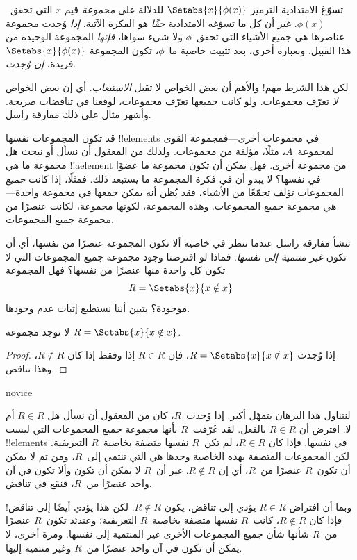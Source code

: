 \documentclass[../../../include/open-logic-section]{subfiles}
\begin{document}

تسوّغ الامتدادية الترميز $\Setabs{x}{\phi(x)}$ للدلالة على
\emph{مجموعة} قيم $x$ التي تحقق~$\phi(x)$. غير أن كل ما تسوّغه
الامتدادية \emph{حقًا} هو الفكرة الآتية. \emph{إذا} وُجدت مجموعة
عناصرها هي جميع الأشياء التي تحقق~$\phi$ ولا شيء سواها، \emph{فإنها}
المجموعة الوحيدة من هذا القبيل. وبعبارة أخرى، بعد تثبيت خاصية ما~$\phi$،
تكون المجموعة $\Setabs{x}{\phi(x)}$ فريدة، \emph{إن وُجدت}.

لكن هذا الشرط مهم!{} والأهم أن بعض الخواص لا تقبل
\emph{الاستيعاب}. أي إن بعض الخواص \emph{لا} تعرّف مجموعات.
ولو كانت جميعها تعرّف مجموعات، لوقعنا في تناقضات صريحة. وأشهر مثال
على ذلك مفارقة راسل.

قد تكون المجموعات نفسها !!{element}s في مجموعات أخرى---فمجموعة القوى
لمجموعة~$A$، مثلًا، مؤلفة من مجموعات. ولذلك من المعقول أن نسأل أو
نبحث هل مجموعة ما هي !!a{element} من مجموعة أخرى. فهل يمكن أن تكون
مجموعة ما عضوًا في نفسها؟ لا يبدو أن في فكرة المجموعة ما يستبعد ذلك.
فمثلًا، إذا كانت \emph{جميع} المجموعات تؤلف تجمّعًا من الأشياء، فقد
يُظن أنه يمكن جمعها في مجموعة واحدة---هي مجموعة جميع المجموعات.
وهذه المجموعة، لكونها مجموعة، لكانت عنصرًا من مجموعة جميع
المجموعات.

تنشأ مفارقة راسل عندما ننظر في خاصية ألا تكون المجموعة عنصرًا
من نفسها، أي أن تكون \emph{غير منتمية إلى نفسها}. فماذا لو
افترضنا وجود مجموعة جميع المجموعات التي لا تكون كل واحدة منها
عنصرًا من نفسها؟ فهل المجموعة
\[
R = \Setabs{x}{x \notin x}
\]
موجودة؟ يتبين أننا نستطيع إثبات عدم وجودها.

\begin{thm}
	لا توجد مجموعة $R = \Setabs{x}{x \notin x}$.
\end{thm}

\begin{proof}
إذا وُجدت $R = \Setabs{x}{x \notin x}$، فإن
$R \in R$ إذا وفقط إذا كان $R \notin R$، وهذا تناقض.
\end{proof}

\begin{tagblock}{novice}
\begin{explain}
لنتناول هذا البرهان بتمهّل أكبر. إذا وُجدت~$R$، كان من المعقول أن نسأل
هل $R \in R$ أم لا. افترض أن $R \in R$ بالفعل. لقد عُرّفت~$R$ بأنها
مجموعة جميع المجموعات التي ليست !!{element}s في نفسها. فإذا كان
$R \in R$، لم تكن~$R$ نفسها متصفة بخاصية~$R$ التعريفية. لكن المجموعات
المتصفة بهذه الخاصية وحدها هي التي تنتمي إلى~$R$، ومن ثم لا يمكن أن
تكون~$R$ عنصرًا من~$R$، أي إن $R \notin R$. غير أن~$R$ لا يمكن
أن تكون وألا تكون في آن واحد عنصرًا من~$R$، فنقع في تناقض.

وبما أن افتراض $R \in R$ يؤدي إلى تناقض، يكون $R \notin R$. لكن هذا
يؤدي أيضًا إلى تناقض!{} فإذا كان $R \notin R$، كانت~$R$ نفسها متصفة
بخاصية~$R$ التعريفية؛ وعندئذ تكون~$R$ عنصرًا من~$R$ شأنها شأن
جميع المجموعات الأخرى غير المنتمية إلى نفسها. ومرة أخرى، لا يمكن أن
تكون في آن واحد عنصرًا من~$R$ وغير منتمية إليها.
\end{explain}
\end{tagblock}
\end{document}
